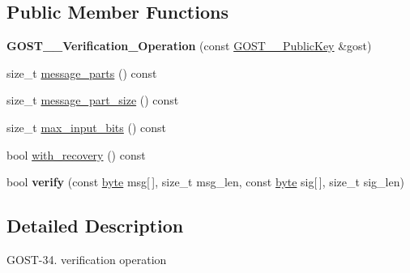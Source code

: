 \subsection*{Public Member Functions}
\begin{DoxyCompactItemize}
\item 
\hypertarget{classBotan_1_1GOST__3410__Verification__Operation_a7cde6eaf0a2e4cd378bc9822ed5e6b31}{{\bfseries G\-O\-S\-T\-\_\-\_\-\-Verification\-\_\-\-Operation} (const \hyperlink{classBotan_1_1GOST__3410__PublicKey}{G\-O\-S\-T\-\_\-\_\-\-Public\-Key} \&gost)}\label{classBotan_1_1GOST__3410__Verification__Operation_a7cde6eaf0a2e4cd378bc9822ed5e6b31}

\item 
size\-\_\-t \hyperlink{classBotan_1_1GOST__3410__Verification__Operation_a11ff8b91845b838fe77bc6e17b579ec1}{message\-\_\-parts} () const 
\item 
size\-\_\-t \hyperlink{classBotan_1_1GOST__3410__Verification__Operation_a61ba703e22239cc09ea43c0c7faeffda}{message\-\_\-part\-\_\-size} () const 
\item 
size\-\_\-t \hyperlink{classBotan_1_1GOST__3410__Verification__Operation_a81ef701b5e4497e7ab89a27788193bc2}{max\-\_\-input\-\_\-bits} () const 
\item 
bool \hyperlink{classBotan_1_1GOST__3410__Verification__Operation_aeda94ec5760c44eb1d57eccf75a20f5e}{with\-\_\-recovery} () const 
\item 
\hypertarget{classBotan_1_1GOST__3410__Verification__Operation_aa62f9dd3a786c464bbb1c0b425eb651c}{bool {\bfseries verify} (const \hyperlink{namespaceBotan_a7d793989d801281df48c6b19616b8b84}{byte} msg\mbox{[}$\,$\mbox{]}, size\-\_\-t msg\-\_\-len, const \hyperlink{namespaceBotan_a7d793989d801281df48c6b19616b8b84}{byte} sig\mbox{[}$\,$\mbox{]}, size\-\_\-t sig\-\_\-len)}\label{classBotan_1_1GOST__3410__Verification__Operation_aa62f9dd3a786c464bbb1c0b425eb651c}

\end{DoxyCompactItemize}


\subsection{Detailed Description}
G\-O\-S\-T-\/34. verification operation 

